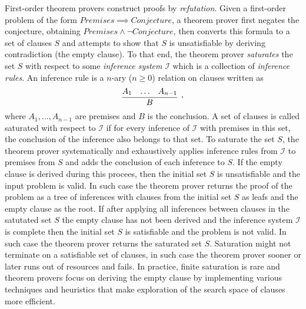 First-order theorem provers construct proofs by \emph{refutation}. Given a first-order problem of the form $\mathit{Premises}\implies\mathit{Conjecture}$, a theorem prover first negates the conjecture, obtaining $\mathit{Premises}\wedge\neg\mathit{Conjecture}$, then converts this formula to a set of clauses $S$ and attempts to show that $S$ is unsatisfiable by deriving contradiction (the empty clause). To that end, the theorem prover \emph{saturates} the set $S$ with respect to some \emph{inference system} $\mathcal{I}$ which is a collection of \emph{inference rules}. An inference rule is a $n$-ary ($n\ge0$) relation on clauses written as \[\infer[,]{B}{A_1 & \ldots & A_{n-1}}\] where $A_1,\ldots,A_{n-1}$ are premises and $B$ is the conclusion. A set of clauses is called saturated with respect to $\mathcal{I}$ if for every inference of $\mathcal{I}$ with premises in this set, the conclusion of the inference also belongs to that set. To saturate the set $S$, the theorem prover systematically and exhaustively applies inference rules from $\mathcal{I}$ to premises from $S$ and adds the conclusion of each inference to $S$. If the empty clause is derived during this procees, then the initial set $S$ is unsatisfiable and the input problem is valid. In such case the theorem prover returns the proof of the problem as a tree of inferences with clauses from the initial set $S$ as leafs and the empty clause as the root. If after applying all inferences between clauses in the satutated set $S$ the empty clause has not been derived and the inference system $\mathcal{I}$ is complete then the initial set $S$ is satisfiable and the problem is not valid. In such case the theorem prover returns the saturated set $S$. Saturation might not terminate on a satisfiable set of clauses, in such case the theorem prover sooner or later runs out of resources and fails. In practice, finite saturation is rare and theorem provers focus on deriving the empty clause by implementing various techniques and heuristics that make exploration of the search space of clauses more efficient.

